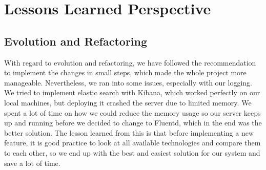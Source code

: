 \section{Lessons Learned Perspective}
\subsection{Evolution and Refactoring}
With regard to evolution and refactoring, we have followed the recommendation to implement the changes in small steps, which made the whole project more manageable. 
Nevertheless, we ran into some issues, especially with our logging. We tried to implement elastic search with Kibana, which worked perfectly on our local machines, 
but deploying it crashed the server due to limited memory. We spent a lot of time on how we could reduce the memory usage so our server keeps up and running 
before we decided to change to Fluentd, which in the end was the better solution. The lesson learned from this is that before implementing a new feature, 
it is good practice to look at all available technologies and compare them to each other, so we end up with the best and easiest solution for our system and save a lot of time. 